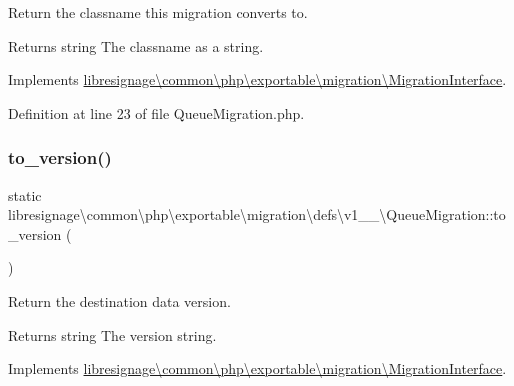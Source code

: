 Return the classname this migration converts to.

\begin{DoxyReturn}{Returns}
string The classname as a string. 
\end{DoxyReturn}


Implements \hyperlink{interfacelibresignage_1_1common_1_1php_1_1exportable_1_1migration_1_1MigrationInterface_ab1f33cdd8684595d6b000bcbc7c4d5a4}{libresignage\textbackslash{}common\textbackslash{}php\textbackslash{}exportable\textbackslash{}migration\textbackslash{}\+Migration\+Interface}.



Definition at line 23 of file Queue\+Migration.\+php.

\mbox{\label{classlibresignage_1_1common_1_1php_1_1exportable_1_1migration_1_1defs_1_1v1__0__0_1_1QueueMigration_a30b79695f73d817899b0dc02b24c2fa6}} 
\subsubsection{\texorpdfstring{to\+\_\+version()}{to\_version()}}
{\footnotesize\ttfamily static libresignage\textbackslash{}common\textbackslash{}php\textbackslash{}exportable\textbackslash{}migration\textbackslash{}defs\textbackslash{}v1\+\_\+\_\textbackslash{}\+Queue\+Migration\+::to\+\_\+version (\begin{DoxyParamCaption}{ }\end{DoxyParamCaption})\hspace{0.3cm}{\ttfamily [static]}}

Return the destination data version.

\begin{DoxyReturn}{Returns}
string The version string. 
\end{DoxyReturn}


Implements \hyperlink{interfacelibresignage_1_1common_1_1php_1_1exportable_1_1migration_1_1MigrationInterface_a9eddabf63771d4d1081bd6d067c7dff5}{libresignage\textbackslash{}common\textbackslash{}php\textbackslash{}exportable\textbackslash{}migration\textbackslash{}\+Migration\+Interface}.



